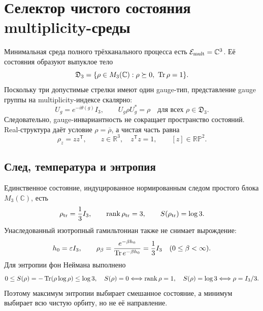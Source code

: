 \chapter{Селектор чистого состояния multiplicity-среды}
\label{ch:v8-baryon-c0-multiplicity-environment-pure-state-selector-gate}

Минимальная среда полного трёхканального процесса есть
$\mathcal E_{\rm mult}=\mathbb C^3$. Её состояния образуют выпуклое тело
\begin{equation}
 \mathfrak D_3=\{\rho\in M_3(\mathbb C):\rho\succeq0,
 \ \operatorname{Tr}\rho=1\}.
 \label{eq:v8-baryon-c0-multiplicity-density-space}
\end{equation}
Поскольку три допустимые стрелки имеют один gauge-тип, представление gauge
группы на multiplicity-индексе скалярно:
\begin{equation}
 U_g=e^{-i\theta(g)}I_3,
 \qquad U_g\rho U_g^*=\rho
 \quad\text{для всех }\rho\in\mathfrak D_3.
 \label{eq:v8-baryon-c0-scalar-gauge-action-on-environment}
\end{equation}
Следовательно, gauge-инвариантность не сокращает пространство состояний.
Real-структура даёт условие $\rho=\overline\rho$, а чистая часть равна
\begin{equation}
 \rho_z=zz^{\mathsf T},
 \qquad z\in\mathbb R^3,\quad z^{\mathsf T}z=1,
 \qquad [z]\in\mathbb{RP}^2.
 \label{eq:v8-baryon-c0-real-pure-environment-orbit}
\end{equation}

\section{След, температура и энтропия}

Единственное состояние, индуцированное нормированным следом простого
блока $M_3(\mathbb C)$, есть
\begin{equation}
 \rho_{\rm tr}=\frac13I_3,
 \qquad \operatorname{rank}\rho_{\rm tr}=3,
 \qquad S(\rho_{\rm tr})=\log3.
 \label{eq:v8-baryon-c0-normalized-trace-environment-state}
\end{equation}
Унаследованный изотропный гамильтониан также не снимает вырождение:
\begin{equation}
 h_0=\varepsilon I_3,
 \qquad
 \rho_\beta=\frac{e^{-\beta h_0}}{\operatorname{Tr} e^{-\beta h_0}}
 =\frac13I_3
 \quad(0\leq\beta<\infty).
 \label{eq:v8-baryon-c0-isotropic-gibbs-state}
\end{equation}
Для энтропии фон Неймана выполнено
\begin{equation}
 0\leq S(\rho)=-\operatorname{Tr}(\rho\log\rho)\leq\log3,
 \quad
 S(\rho)=0\Longleftrightarrow\operatorname{rank}\rho=1,
 \quad
 S(\rho)=\log3\Longleftrightarrow\rho=I_3/3.
 \label{eq:v8-baryon-c0-entropy-extrema}
\end{equation}
Поэтому максимум энтропии выбирает смешанное состояние, а минимум выбирает
всю чистую орбиту, но не её направление.

